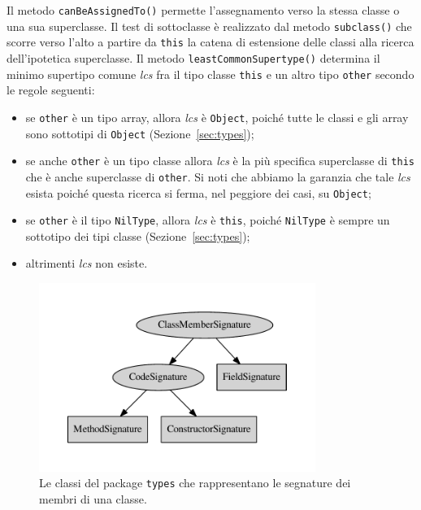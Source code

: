 Il metodo \texttt{canBeAssignedTo()} permette l'assegnamento verso la
stessa classe o una sua superclasse.
Il test di sottoclasse \`e realizzato dal metodo \texttt{subclass()}
che scorre verso l'alto a partire da \texttt{this}
la catena di estensione delle classi alla ricerca
dell'ipotetica superclasse.
Il metodo \texttt{leastCommonSupertype()} determina il minimo supertipo
comune \emph{lcs}
fra il tipo classe \texttt{this} e un altro tipo \texttt{other}
secondo le regole seguenti:
%
\begin{itemize}
\item se \texttt{other} \`e un tipo array, allora \emph{lcs} \`e
      \texttt{Object}, poich\'e tutte le classi e gli array sono
      sottotipi di \texttt{Object} (Sezione~\ref{sec:types});
\item se anche \texttt{other} \`e un tipo classe allora \emph{lcs}
      \`e la pi\`u specifica superclasse di \texttt{this} che \`e anche
      superclasse di \texttt{other}. Si noti che abbiamo la garanzia che
      tale \emph{lcs} esista poich\'e questa ricerca si ferma, nel
      peggiore dei casi, su \texttt{Object};
\item se \texttt{other} \`e il tipo \texttt{NilType}, allora
      \emph{lcs} \`e \texttt{this}, poich\'e \texttt{NilType} \`e
      sempre un sottotipo dei tipi classe (Sezione~\ref{sec:types});
\item altrimenti \emph{lcs} non esiste.
\end{itemize}
%
\begin{figure}[t]
\begin{center}
\includegraphics[width=9cm]{signatures_hierarchy.pdf}
\end{center}
\caption{Le classi del package \texttt{types} che rappresentano le segnature dei membri di una classe.}\label{fig:signatures}
\end{figure}
%
